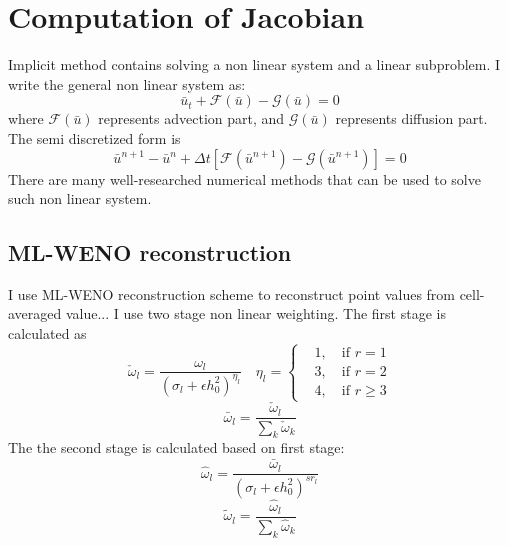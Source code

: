 \documentclass[smallextended]{svjour3}       %
\begin{document}
\section{Computation of Jacobian}
Implicit method contains solving a non linear system and a linear subproblem.
I write the general non linear system as:
\begin{equation} \label{eq:nonlinear}
		  \bar u_t + \mathscr{F}(\bar u) - \mathscr{G}(\bar u) = 0
\end{equation}
where $\mathscr{F}(\bar u)$ represents advection part, and $\mathscr{G} (\bar u)$ represents diffusion part.
The semi discretized form is 
\begin{equation}
		  \bar u^{n+1} - \bar u^{n} + \Delta t [\mathscr{F} (\bar u^{n+1}) - \mathscr{G}(\bar u^{n+1})] = 0
\end{equation}
There are many well-researched numerical methods that can be used to solve such non linear system.
\subsection{ML-WENO reconstruction}
I use ML-WENO reconstruction scheme to reconstruct point values
from cell-averaged value...
I use two stage non linear weighting. The first stage is
calculated as
\begin{equation}\label{eq:fstage}
		  \check \omega_l = \frac{\omega_l}{(\sigma_l + \epsilon h^2_0)^{\eta_l}} 
		  \quad \eta_l = \left \{\begin{aligned}
					 &1, \quad \text{if } r=1\\
					 &3, \quad \text{if } r=2\\
					 &4, \quad \text{if } r\geq 3
		  \end{aligned}
		  \right .
\end{equation}
\begin{equation}\label{eq:fstagenorm}
		  \bar \omega_l = \frac{\check \omega_l}{\sum_k \check \omega_k}
\end{equation}
The the second stage is calculated based on first stage:
\begin{equation}\label{eq:sstage}
		  \hat \omega_l = \frac{\bar \omega_l}{(\sigma_l + \epsilon h^2_0)^{sr_l}}
\end{equation}
\begin{equation}\label{eq:sstagenorm}
		  \tilde \omega_l = \frac{\hat \omega_l}{\sum_k \hat \omega_k}
\end{equation}
\end{document}
